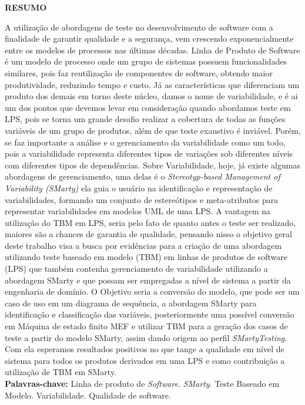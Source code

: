 \clearpage
\thispagestyle{empty}

\noindent{\large\bf\dadoTitulo}
\noindent{\large\dadoSubTitulo}

\normalsize
\begin{center}	
	\vspace*{0.5cm}
	\textbf{RESUMO}
\end{center}


A utilização de abordagens de teste no desenvolvimento de software com a finalidade de garantir qualidade e a segurança, vem crescendo exponencialmente entre os modelos de processos nas últimas décadas. Linha de Produto de Software é um modelo de processo onde um grupo de sistemas possuem funcionalidades similares, pois faz reutilização de componentes de software, obtendo maior produtividade, reduzindo tempo e custo. Já as características que diferenciam um produto dos demais em torno deste núcleo, damos o nome de variabilidade, e é ai um dos pontos que devemos levar em consideração quando abordamos teste em LPS, pois se torna um grande desafio realizar a cobertura de todas as funções variáveis de um grupo de produtos, além de que teste exaustivo é inviável. Porém, se faz importante a análise e o gerenciamento da variabilidade como um todo, pois a variabilidade representa diferentes tipos de variações sob diferentes níveis com diferentes tipos de dependências. Sobre Variabilidade, hoje, já existe algumas abordagens de gerenciamento, uma delas é o \textit{Stereotyp-based Management of Variability (SMarty)} ela guia o usuário na identificação e representação de variabilidades, formando um conjunto de estereótipos e meta-atributos para representar variabilidades em modelos UML de uma LPS.  A vantagem na utilização do TBM em LPS, seria pelo fato de quanto antes o teste ser realizado, maiores são a chances de garantia de qualidade, pensando nisso o objetivo geral deste trabalho visa a busca por evidências para a criação de uma abordagem utilizando teste baseado em modelo (TBM) em linhas de produtos de software (LPS) que também contenha gerenciamento de variabilidade utilizando a abordagem SMarty e que possam ser empregadas a nível de sistema a partir da engenharia de domínio. O Objetivo seria a conversão do modelo, que pode ser um caso de uso em um diagrama de sequência, a abordagem SMarty para identificação e classificação das variáveis, posteriormente uma possível conversão em Máquina de estado finito MEF e utilizar TBM para a geração dos casos de teste a partir do modelo SMarty, assim dando origem ao perfil \textit{SMartyTesting}. Com ela esperamos resultados positivos no que tange a qualidade em nível de sistema para todos os produtos derivados em uma LPS e como contribuição a utilização de TBM em SMarty.
 \\
 
\noindent 
\textbf{Palavras-chave:} Linha de produto de \textit{Software}. \textit{SMarty}. Teste Baseado em Modelo. Variabilidade. Qualidade de software.

\pagebreak

